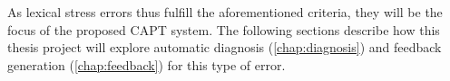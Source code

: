 	As lexical stress errors thus fulfill the aforementioned criteria, they will  be the focus of the proposed CAPT system. The following sections describe how this thesis project will explore  automatic diagnosis (\cref{chap:diagnosis}) and feedback generation (\cref{chap:feedback}) for this type of error.		
		

	

